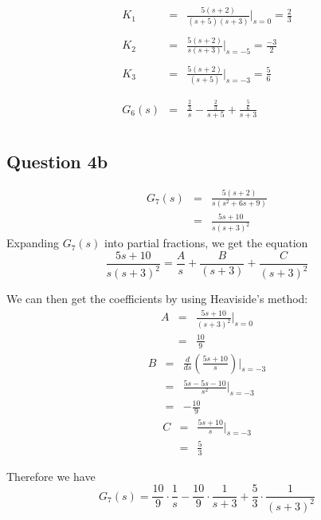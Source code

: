 \documentclass[12pt, a4paper]{article}
\begin{document}
		\begin{equation*}
			\begin{array}{rcl}
				K_1 & = & \frac{5(s+2)}{(s+5)(s+3)} \bigg\rvert_{s=0} = \frac{2}{3}\\
				\\
				K_2 & = & \frac{5(s+2)}{s(s+3)} \bigg\rvert_{s=-5} = \frac{-3}{2} \\
				\\
				K_3 & = & \frac{5(s+2)}{(s+5)} \bigg\rvert_{s=-3} = \frac{5}{6} \\
				\\
				\\
				G_6(s) & = & \frac{\frac{2}{3}}{s} - \frac{\frac{2}{3}}{s+5} + \frac{\frac{5}{6}}{s+3}\\
			\end{array}
		\end{equation*}

	\subsection*{Question 4b}
		\label{sub:question_4b}
		\[
			\begin{array}{rcl}
				G_7(s) & = & \frac{5(s+2)}{s(s^2 + 6s + 9)}\\
				& = & \frac{5s+10}{s(s+3)^2}
			\end{array}
		\]
		\noindent Expanding $G_7(s)$ into partial fractions, we get the equation
		\[
			\frac{5s+10}{s(s+3)^2} = \frac{A}{s} + \frac{B}{(s+3)} + \frac{C}{(s+3)^2}
		\]

		We can then get the coefficients by using Heaviside's method:
		\[
			\begin{array}{rcl}
				A & = & \frac{5s + 10}{(s+3)^2}\bigg\rvert_{s=0}\\
				& = & \frac{10}{9}
			\end{array}
		\]
		\[
			\begin{array}{rcl}
				B & = & \frac{d}{ds}\left(\frac{5s + 10}{s}\right)\bigg\rvert_{s=-3}\\
				& = & \frac{5s - 5s - 10}{s^2}\bigg\rvert_{s=-3}\\
				& = & -\frac{10}{9}
			\end{array}
		\]
		\[
			\begin{array}{rcl}
				C & = & \frac{5s + 10}{s}\bigg\rvert_{s=-3} \\
				& = & \frac{5}{3}
			\end{array}
		\]

		\noindent Therefore we have
		\[
			G_7(s) = \frac{10}{9} \cdot \frac{1}{s} - \frac{10}{9} \cdot \frac{1}{s+3} + \frac{5}{3} \cdot \frac{1}{(s+3)^2}
		\]
\end{document}
